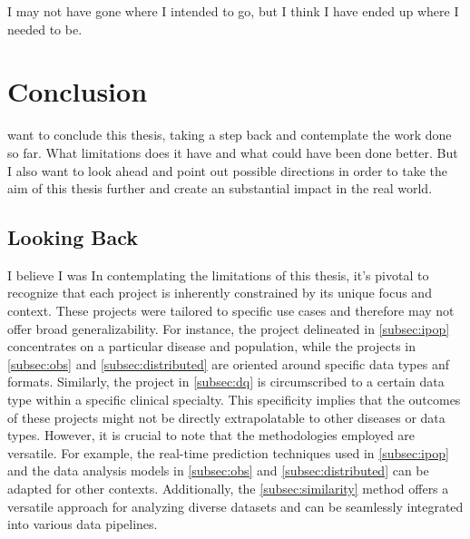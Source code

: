 

\begin{savequote}[75mm]
I may not have gone where I intended to go,
but I think I have ended up where I needed to be.

\end{savequote}

\chapter{Conclusion} \label{chap:conclusion}
 want to conclude this thesis, taking a step back and contemplate the work done so far. What limitations does it have and what could have been done better.
But I also want to look ahead and point out possible directions in order to take the aim of this thesis further and create an substantial impact in the real world.

\section{Looking Back}
I believe I was 
In contemplating the limitations of this thesis, it's pivotal to recognize that each project is inherently constrained by its unique focus and context. These projects were tailored to specific use cases and therefore may not offer broad generalizability. For instance, the project delineated in \ref{subsec:ipop} concentrates on a particular disease and population, while the projects in \ref{subsec:obs} and \ref{subsec:distributed} are oriented around specific data types anf formats. Similarly, the project in \ref{subsec:dq} is circumscribed to a certain data type within a specific clinical specialty. This specificity implies that the outcomes of these projects might not be directly extrapolatable to other diseases or data types. However, it is crucial to note that the methodologies employed are versatile. For example, the real-time prediction techniques used in \ref{subsec:ipop} and the data analysis models in \ref{subsec:obs} and \ref{subsec:distributed} can be adapted for other contexts. Additionally, the \ref{subsec:similarity} method offers a versatile approach for analyzing diverse datasets and can be seamlessly integrated into various data pipelines.



